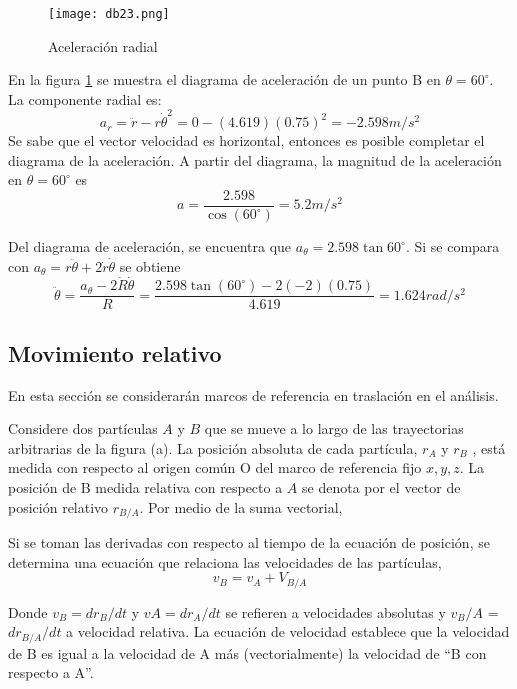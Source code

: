 \begin{figure}[h!]
  \centerline{\texttt{[image: db23.png]}}
  \caption{Aceleración radial}
  \label{db23}
\end{figure}
En la figura \ref{db23} se muestra el diagrama de aceleración de un
punto B en $\theta = 60^{\circ}$. La componente radial es:
\begin{equation*}
    a_r=\ddot{r}-r\dot{\theta}^2=0-(4.619)(0.75)^2=-2.598m/s^2
\end{equation*}
Se sabe que el vector velocidad es horizontal, entonces es
posible completar el diagrama de la aceleración. A partir
del diagrama, la magnitud de la aceleración en $\theta = 60^{\circ}$ es
\begin{equation*}
    a=\frac{2.598}{\cos{(60^{\circ})}}=5.2m/s^2
\end{equation*}

Del diagrama de aceleración, se encuentra que $a_{\theta} = 2.598 \tan{60^{\circ}}$. Si se compara con $a_{\theta} = r\ddot{\theta}+ 2\dot{r}\dot{\theta}$ se obtiene
\begin{equation*}
    \ddot{\theta}=\frac{a_{\theta}-2\dot{R}\dot{\theta}}{R}=\frac{2.598\tan{(60^{\circ})}-2(-2)(0.75)}{4.619}=1.624rad/s^2
\end{equation*}

\subsection{Movimiento relativo}

En esta sección se considerarán marcos de referencia en
traslación en el análisis.


\begin{definition}[Posición]
    Considere dos partículas $A$ y $B$ que se mueve a
lo largo de las trayectorias arbitrarias de la figura (a). La
posición absoluta de cada partícula, $r_A$ y $r_B$ , está medida
con respecto al origen común O del marco de referencia
fijo $x,y,z$. La posición de B medida relativa con respecto
a $A$ se denota por el vector de posición relativo $r_{B/A}$. Por
medio de la suma vectorial,
\end{definition}

\begin{definition}[Velocidad]
    Si se toman las derivadas con respecto al
tiempo de la ecuación de posición, se determina una
ecuación que relaciona las velocidades de las partículas,
\begin{equation}
    v_B=v_A+V_{B/A}
\end{equation}
\end{definition}
Donde $v_B = dr_B/dt$ y $vA=dr_A/dt$ se refieren a velocidades absolutas
y $v_B/A$ = $dr_{B/A}/dt$ a velocidad relativa. La ecuación de velocidad
establece que la velocidad de B es igual a la velocidad de A más
(vectorialmente) la velocidad de ``B con respecto a A''.

